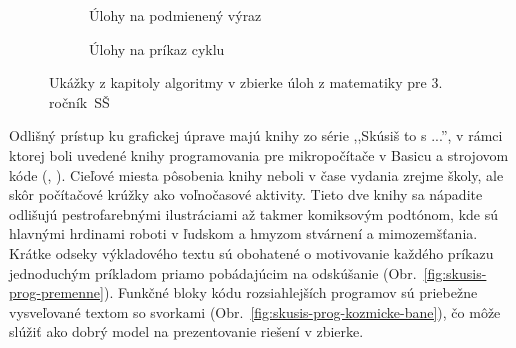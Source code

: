 \begin{figure}[h]
\centering
\begin{subfigure}[b]{0.48\textwidth}
\centering
{}
\caption{Úlohy na podmienený výraz}
\end{subfigure}
\hfill
\begin{subfigure}[b]{0.48\textwidth}
\centering
{}
\caption{Úlohy na príkaz cyklu}
\end{subfigure}
\caption{Ukážky z kapitoly algoritmy v zbierke úloh z matematiky pre 3. ročník~SŠ}
\label{fig:matematika-slovne-ulohy}
\end{figure}

Odlišný prístup ku grafickej úprave majú knihy zo série ,,Skúsiš to s ...'', v rámci ktorej boli uvedené knihy programovania pre mikropočítače v Basicu a strojovom kóde (\cite{tatchellova_skusis_1990}, \cite{wattsova_skusis_1991}). Cieľové miesta pôsobenia knihy neboli v čase vydania zrejme školy, ale skôr počítačové krúžky ako voľnočasové aktivity. Tieto dve knihy sa nápadite odlišujú pestrofarebnými ilustráciami až takmer komiksovým podtónom, kde sú hlavnými hrdinami roboti v ľudskom a hmyzom stvárnení a mimozemšťania. Krátke odseky výkladového textu sú obohatené o motivovanie každého príkazu jednoduchým príkladom priamo pobádajúcim na odskúšanie (Obr.~\ref{fig:skusis-prog-premenne}). Funkčné bloky kódu rozsiahlejších programov sú priebežne vysveľované textom so svorkami (Obr.~\ref{fig:skusis-prog-kozmicke-bane}), čo môže slúžiť ako dobrý model na prezentovanie riešení v zbierke.

